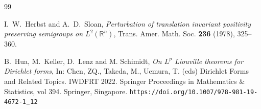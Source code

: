 \documentclass[12pt,a4paper]{article}
\newcommand{\R}{\mathbb{R}}
\newcommand{\1}{{\bf 1}}
\begin{document}
\begin{thebibliography}{99}

%




   {I.~W.~Herbst and A.~D.~Sloan},
    \emph{Perturbation of translation invariant positivity preserving semigroups on $L^2(\R^n)$}, 
  Trans. Amer. Math. Soc. {\bf 236} (1978), 325--360.

%
%
%
%
%
%
%


{B.~Hua, M.~Keller, D.~Lenz and M. Schimidt}, 
\emph{On $L^p$ Liouville theorems for Dirichlet forms}, In: Chen, ZQ., Takeda, M., Uemura, T. (eds) Dirichlet Forms and Related Topics. IWDFRT 2022. Springer Proceedings in Mathematics \& Statistics, vol 394. Springer, Singapore. 
{\tt https://doi.org/10.1007/978-981-19-4672-1{${}_{-}$}12}



\end{thebibliography}
\end{document}

